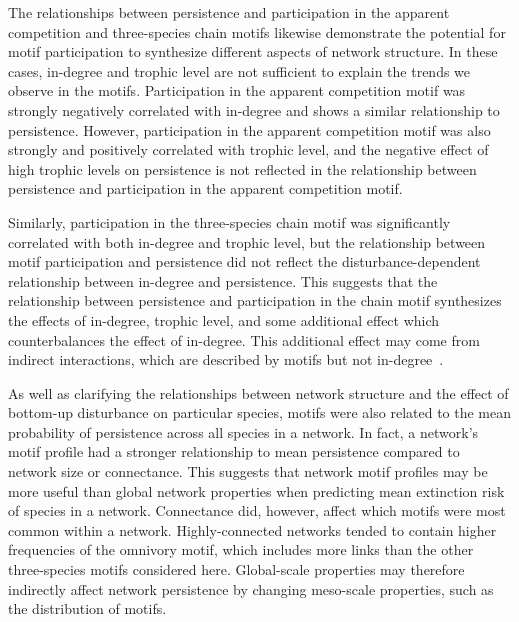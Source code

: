 \documentclass[12pt]{article}
\begin{document}
\begin{spacing}{2.0}
    
    The relationships between persistence and participation in the apparent competition and three-species chain motifs likewise demonstrate the potential for motif participation to synthesize different aspects of network structure.
    In these cases, in-degree and trophic level are not sufficient to explain the trends we observe in the motifs.
    Participation in the apparent competition motif was strongly negatively correlated with in-degree and shows a similar relationship to persistence.
    However, participation in the apparent competition motif was also strongly and positively correlated with trophic level, and the negative effect of high trophic levels on persistence is not reflected in the relationship between persistence and participation in the apparent competition motif.
    
    
    Similarly, participation in the three-species chain motif was significantly correlated with both in-degree and trophic level, but the relationship between motif participation and persistence did not reflect the disturbance-dependent relationship between in-degree and persistence.
    This suggests that the relationship between persistence and participation in the chain motif synthesizes the effects of in-degree, trophic level, and some additional effect which counterbalances the effect of in-degree.
    This additional effect may come from indirect interactions, which are described by motifs but not in-degree~\citep{Cirtwill2018FoodWebs}. 
    
    
    As well as clarifying the relationships between network structure and the effect of bottom-up disturbance on particular species, motifs were also related to the mean probability of persistence across all species in a network.
    In fact, a network's motif profile had a stronger relationship to mean persistence compared to network size or connectance. 
    This suggests that network motif profiles may be more useful than global network properties when predicting mean extinction risk of species in a network.
    Connectance did, however, affect which motifs were most common within a network. 
    Highly-connected networks tended to contain higher frequencies of the omnivory motif, which includes more links than the other three-species motifs considered here.
    Global-scale properties may therefore indirectly affect network persistence by changing meso-scale properties, such as the distribution of motifs. 
    

\end{spacing}
\end{document}
